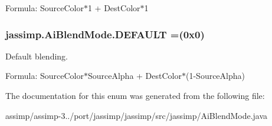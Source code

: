 Formula\+: {\ttfamily  Source\+Color$\ast$1 + Dest\+Color$\ast$1 } \hypertarget{enumjassimp_1_1_ai_blend_mode_a86f3ba70030a6263ccdc6f4d558908c0}{
\subsubsection[{D\+E\+F\+A\+U\+L\+T}]{\setlength{\rightskip}{0pt plus 5cm}jassimp.\+Ai\+Blend\+Mode.\+D\+E\+F\+A\+U\+L\+T =(0x0)}}\label{enumjassimp_1_1_ai_blend_mode_a86f3ba70030a6263ccdc6f4d558908c0}
Default blending.

Formula\+: {\ttfamily  Source\+Color$\ast$\+Source\+Alpha + Dest\+Color$\ast$(1-\/\+Source\+Alpha) } 

The documentation for this enum was generated from the following file\+:\begin{DoxyCompactItemize}
\item 
assimp/assimp-\/3../port/jassimp/jassimp/src/jassimp/Ai\+Blend\+Mode.\+java\end{DoxyCompactItemize}
